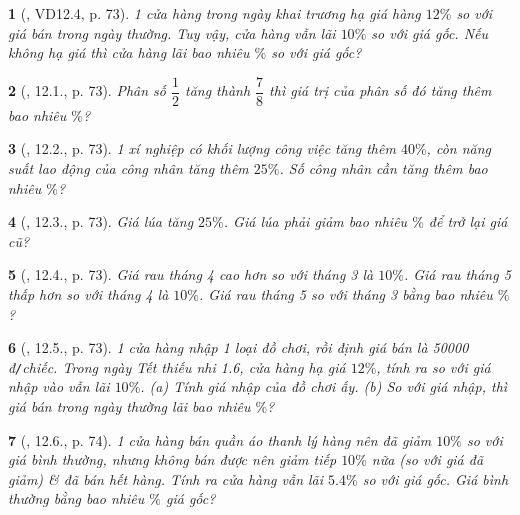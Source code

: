 \documentclass{article}
\newtheorem{baitoan}{}
\begin{document}
\begin{baitoan}[\cite{TLCT_THCS_Toan_6_so_hoc}, VD12.4, p. 73]
	1 cửa hàng trong ngày khai trương hạ giá hàng $12\%$ so với giá bán trong ngày thường. Tuy vậy, cửa hàng vẫn lãi $10\%$ so với giá gốc. Nếu không hạ giá thì cửa hàng lãi bao nhiêu $\%$ so với giá gốc?
\end{baitoan}

\begin{baitoan}[\cite{TLCT_THCS_Toan_6_so_hoc}, 12.1., p. 73]
	Phân số $\dfrac{1}{2}$ tăng thành $\dfrac{7}{8}$ thì giá trị của phân số đó tăng thêm bao nhiêu $\%$?
\end{baitoan}

\begin{baitoan}[\cite{TLCT_THCS_Toan_6_so_hoc}, 12.2., p. 73]
	1 xí nghiệp có khối lượng công việc tăng thêm $40\%$, còn năng suất lao động của công nhân tăng thêm $25\%$. Số công nhân cần tăng thêm bao nhiêu $\%$?
\end{baitoan}

\begin{baitoan}[\cite{TLCT_THCS_Toan_6_so_hoc}, 12.3., p. 73]
	Giá lúa tăng $25\%$. Giá lúa phải giảm bao nhiêu $\%$ để trở lại giá cũ?
\end{baitoan}

\begin{baitoan}[\cite{TLCT_THCS_Toan_6_so_hoc}, 12.4., p. 73]
	Giá rau tháng 4 cao hơn so với tháng 3 là $10\%$. Giá rau tháng 5 thấp hơn so với tháng 4 là $10\%$. Giá rau tháng 5 so với tháng 3 bằng bao nhiêu $\%$?
\end{baitoan}

\begin{baitoan}[\cite{TLCT_THCS_Toan_6_so_hoc}, 12.5., p. 73]
	1 cửa hàng nhập 1 loại đồ chơi, rồi định giá bán là {\rm50000 đ{\tt/}chiếc}. Trong ngày Tết thiếu nhi 1.6, cửa hàng hạ giá $12\%$, tính ra so với giá nhập vào vẫn lãi $10\%$. (a) Tính giá nhập của đồ chơi ấy. (b) So với giá nhập, thì giá bán trong ngày thường lãi bao nhiêu $\%$?
\end{baitoan}

\begin{baitoan}[\cite{TLCT_THCS_Toan_6_so_hoc}, 12.6., p. 74]
	1 cửa hàng bán quần áo thanh lý hàng nên đã giảm $10\%$ so với giá bình thường, nhưng không bán được nên giảm tiếp $10\%$ nữa (so với giá đã giảm) \& đã bán hết hàng. Tính ra cửa hàng vẫn lãi $5.4\%$ so với giá gốc. Giá bình thường bằng bao nhiêu $\%$ giá gốc?
\end{baitoan}
\end{document}
